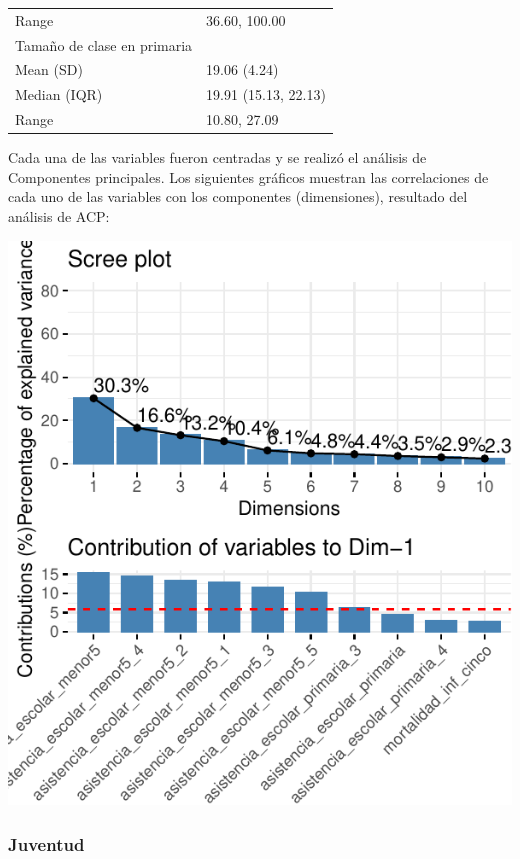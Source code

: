 \begin{table}
\begin{tabular}{ll}
\hspace{1em}Range & 36.60, 100.00\\
Tamaño de clase en primaria & \\
\addlinespace
\hspace{1em}Mean (SD) & 19.06 (4.24)\\
\hspace{1em}Median (IQR) & 19.91 (15.13, 22.13)\\
\hspace{1em}Range & 10.80, 27.09\\
\bottomrule
\end{tabular}
\endgroup{}
\end{table}

Cada una de las variables fueron centradas y se realizó el análisis de
Componentes principales. Los siguientes gráficos muestran las
correlaciones de cada uno de las variables con los componentes
(dimensiones), resultado del análisis de ACP:

\includegraphics{Anexo_PCA_files/figure-latex/unnamed-chunk-1-8.pdf}

\hypertarget{juventud}{%
\subsubsection{Juventud}\label{juventud}}

